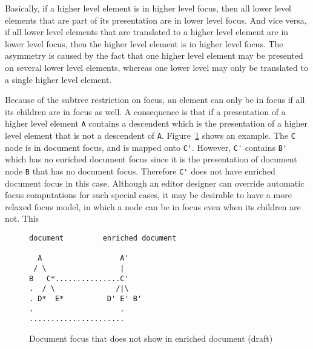 Basically, if a higher level element is in higher level focus, then all lower level elements that are part of its presentation are in lower level focus. And vice versa, if all lower level elements that are translated to a higher level element are in lower level focus, then the higher level element is in higher level focus. The asymmetry is caused by the fact that one higher level element may be presented on several lower level elements, whereas one lower level may only be translated to a single higher level element.

Because of the subtree restriction on focus, an element can only be in focus if all its children are in focus as well.  A consequence is that if a presentation of a higher level element \verb|A| contains a descendent which is the presentation of a higher level element that is not a descendent of \verb|A|. Figure~\ref{unpresentableFocus} shows an example. The \verb|C| node is in document focus, and is mapped onto \verb|C'|. However, \verb|C'| contains \verb|B'| which has no enriched document focus since it is the presentation of document node \verb|B| that has no document focus. Therefore \verb|C'| does not have enriched document focus in this case. Although an editor designer can override automatic focus computations for such special cases, it may be desirable to have a more relaxed focus model, in which a node can be in focus even when its children are not. This 


\begin{figure}
\begin{small}
\begin{center}
\begin{verbatim}
document         enriched document

  A                  A'
 / \                 |
B   C*...............C'
.  / \              /|\
. D*  E*          D' E' B'
.                    .
......................    
\end{verbatim}
\caption{Document focus that does not show in enriched document (draft)}\label{unpresentableFocus} 
\end{center}
\end{small}
\end{figure}


